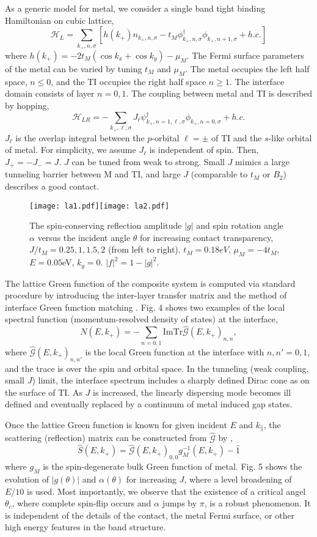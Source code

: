 \documentclass[11pt]{report}
\newcommand{\kp}{k_{+}}
\begin{document}
As a generic model for metal, we consider a single band tight binding Hamiltonian on cubic lattice,
\[
\mathscr{H}_L=\sum_{\kp,n,\sigma}[h({\kp})  n_{\kp,n,\sigma}
- t_M \phi_{\kp,n,\sigma}^\dagger  \phi_{\kp,n+1,\sigma} + h.c.] 
\]
where $h(\kp)=-2t_M(\cos k_x+\cos k_y)-\mu_M$. 
The Fermi surface parameters of the metal can be varied by tuning $t_M$ and $\mu_M$.
The metal occupies the left half space, $n\leq 0$, and 
the TI occupies the right half space $n\geq 1$. The interface domain consists of layer $n=0,1$. 
The coupling between metal and TI is described by hopping,
\[
\mathscr{H}_{LR}=-\sum_{\kp,\ell,\sigma}J_{\ell}\psi^{\dagger}_{\kp,n=1,\ell,\sigma}\phi_{\kp,n=0,\sigma}+h.c.
\]
$J_{\ell}$ is the overlap integral between the $p$-orbital $\ell=\pm$ of TI and the $s$-like orbital of metal. For simplicity, we assume $J_{\ell}$ is independent of spin. Then, $J_{+}=-J_{-}=J$. $J$ can be tuned from weak to strong. Small $J$ mimics a large tunneling barrier between M and TI, 
and large $J$ (comparable to $t_M$ or $B_2$) describes a good contact. 

\begin{figure}
\texttt{[image: la1.pdf]}\texttt{[image: la2.pdf]}
\caption{The spin-conserving reflection amplitude $|g|$ and spin rotation angle 
$\alpha$ versus the incident angle $\theta$ for increasing contact transparency,
$J/t_M=0.25, 1, 1.5, 2$ (from left to right). $t_M=0.18eV$, $\mu_M=-4t_M$, $E=0.05$eV, $k_y=0$.
$|f|^2=1-|g|^2$. 
}
\end{figure}

The lattice Green function of the composite system is computed via 
standard procedure by introducing the inter-layer transfer matrix 
and the method of interface Green function matching \cite{gf}. 
Fig. 4 shows two examples of the local spectral function 
(momentum-resolved density of states) at the interface,
\[ 
N(E,\kp)=-\sum_{n=0,1}\mathrm{Im Tr}\hat{\mathscr{G}}(E,\kp)_{n,n}, 
\]
where $\hat{\mathscr{G}}(E,\kp)_{n,n'}$ is 
the local Green function at the interface with $n,n'=0,1$, and  
the trace is over the spin and orbital space. 
In the tunneling (weak coupling, small $J$) limit, the interface spectrum includes 
a sharply defined Dirac cone as on the surface of TI. As $J$ is increased, 
the linearly dispersing mode becomes ill defined and eventually replaced 
by a continuum of metal induced gap states.

Once the lattice Green function is known for given incident $E$ and $k_{\parallel}$, 
the scattering (reflection) matrix can be constructed from $\hat{\mathscr{G}}$ by \cite{gf},
\[
\hat{S}(E,\kp)=\hat{\mathscr{G}}(E,\kp)_{0,0}g_M^{-1}(E,\kp)-\hat{1}
\]
where $g_M$ is the spin-degenerate bulk Green function of metal. Fig. 5 shows
the evolution of $|g(\theta)|$ and $\alpha(\theta)$ for increasing $J$, where 
a level broadening of $E/10$ is used. Most importantly,
we observe that the existence of a critical angel $\theta_c$, 
where complete spin-flip occurs and $\alpha$ jumps by $\pi$, is a robust phenomenon. 
It is independent of the details of the contact, the metal Fermi 
surface, or other high energy features in the band structure.
\end{document}
